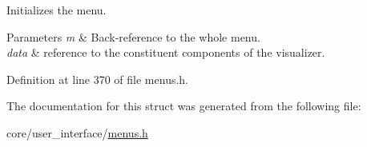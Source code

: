 Initializes the menu. 


\begin{DoxyParams}{Parameters}
{\em m} & Back-\/reference to the whole menu. \\
\hline
{\em data} & reference to the constituent components of the visualizer. \\
\hline
\end{DoxyParams}


Definition at line 370 of file menus.\+h.



The documentation for this struct was generated from the following file\+:\begin{DoxyCompactItemize}
\item 
core/user\+\_\+interface/\hyperlink{menus_8h}{menus.\+h}\end{DoxyCompactItemize}
